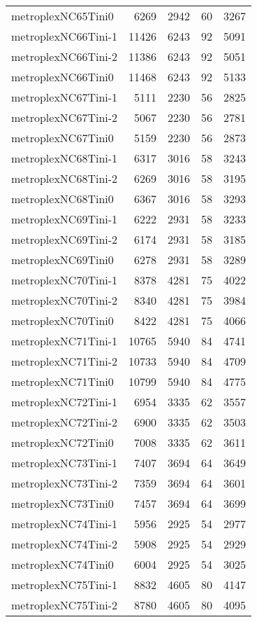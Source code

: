 \begin{longtable}{lrrrr}
metroplexNC65Tini0 & 6269 & 2942 & 60 & 3267 \\
metroplexNC66Tini-1 & 11426 & 6243 & 92 & 5091 \\
metroplexNC66Tini-2 & 11386 & 6243 & 92 & 5051 \\
metroplexNC66Tini0 & 11468 & 6243 & 92 & 5133 \\
metroplexNC67Tini-1 & 5111 & 2230 & 56 & 2825 \\
metroplexNC67Tini-2 & 5067 & 2230 & 56 & 2781 \\
metroplexNC67Tini0 & 5159 & 2230 & 56 & 2873 \\
metroplexNC68Tini-1 & 6317 & 3016 & 58 & 3243 \\
metroplexNC68Tini-2 & 6269 & 3016 & 58 & 3195 \\
metroplexNC68Tini0 & 6367 & 3016 & 58 & 3293 \\
metroplexNC69Tini-1 & 6222 & 2931 & 58 & 3233 \\
metroplexNC69Tini-2 & 6174 & 2931 & 58 & 3185 \\
metroplexNC69Tini0 & 6278 & 2931 & 58 & 3289 \\
metroplexNC70Tini-1 & 8378 & 4281 & 75 & 4022 \\
metroplexNC70Tini-2 & 8340 & 4281 & 75 & 3984 \\
metroplexNC70Tini0 & 8422 & 4281 & 75 & 4066 \\
metroplexNC71Tini-1 & 10765 & 5940 & 84 & 4741 \\
metroplexNC71Tini-2 & 10733 & 5940 & 84 & 4709 \\
metroplexNC71Tini0 & 10799 & 5940 & 84 & 4775 \\
metroplexNC72Tini-1 & 6954 & 3335 & 62 & 3557 \\
metroplexNC72Tini-2 & 6900 & 3335 & 62 & 3503 \\
metroplexNC72Tini0 & 7008 & 3335 & 62 & 3611 \\
metroplexNC73Tini-1 & 7407 & 3694 & 64 & 3649 \\
metroplexNC73Tini-2 & 7359 & 3694 & 64 & 3601 \\
metroplexNC73Tini0 & 7457 & 3694 & 64 & 3699 \\
metroplexNC74Tini-1 & 5956 & 2925 & 54 & 2977 \\
metroplexNC74Tini-2 & 5908 & 2925 & 54 & 2929 \\
metroplexNC74Tini0 & 6004 & 2925 & 54 & 3025 \\
metroplexNC75Tini-1 & 8832 & 4605 & 80 & 4147 \\
metroplexNC75Tini-2 & 8780 & 4605 & 80 & 4095 \\

\end{longtable}

